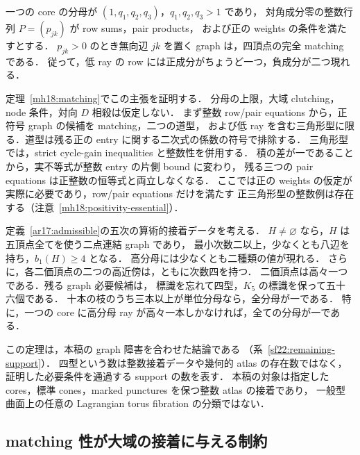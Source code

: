 \begin{theorem}
\label{ar18:main-matching}
一つの core の分母が $(1,q_1,q_2,q_3)$，$q_1,q_2,q_3>1$ であり，
対角成分零の整数行列 $P=(p_{jk})$ が row sums，pair products，
および正の weights の条件を満たすとする．
$p_{jk}>0$ のとき無向辺 $jk$ を置く graph は，四頂点の完全 matching である．
従って，低 ray の row には正成分がちょうど一つ，負成分が二つ現れる．
\end{theorem}

定理~\ref{mh18:matching}でこの主張を証明する．
分母の上限，大域 clutching，node 条件，対向 $D$ 相殺は仮定しない．
まず整数 row/pair equations から，正符号 graph の候補を matching，二つの道型，
および低 ray を含む三角形型に限る．道型は残る正の entry に関する二次式の係数の符号で排除する．
三角形型では，strict cycle-gain inequalities と整数性を併用する．
積の差が一であることから，実不等式が整数 entry の片側 bound に変わり，
残る三つの pair equations は正整数の恒等式と両立しなくなる．
ここでは正の weights の仮定が実際に必要であり，row/pair equations だけを満たす
正三角形型の整数例は存在する（注意~\ref{mh18:positivity-essential}）．

\begin{theorem}
\label{ar17:main-support}
定義~\ref{ar17:admissible}の五次の算術的接着データを考える．
$H\ne\varnothing$ なら，$H$ は五頂点全てを使う二点連結 graph であり，
最小次数二以上，少なくとも八辺を持ち，$b_1(H)\ge4$ となる．
高分母には少なくとも二種類の値が現れる．
さらに，各二価頂点の二つの高近傍は，ともに次数四を持つ．
二価頂点は高々一つである．残る graph 必要候補は，
標識を忘れて四型，$K_5$ の標識を保って五十六個である．
十本の枝のうち三本以上が単位分母なら，全分母が一である．
特に，一つの core に高分母 ray が高々一本しかなければ，全ての分母が一である．
\end{theorem}

この定理は，本稿の graph 障害を合わせた結論である
（系~\ref{sf22:remaining-support}）．
四型という数は整数接着データや幾何的 atlas の存在数ではなく，
証明した必要条件を通過する support の数を表す．
本稿の対象は指定した cores，標準 cones，marked punctures を保つ整数 atlas の接着であり，
一般型曲面上の任意の Lagrangian torus fibration の分類ではない．

\subsection{matching 性が大域の接着に与える制約}

